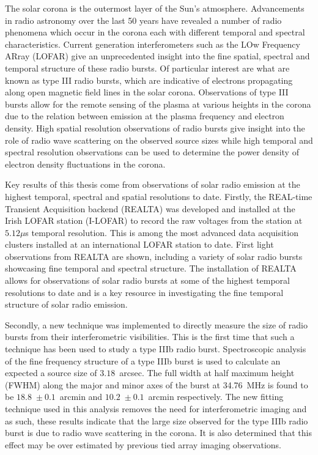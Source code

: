 \begin{abstracts} 
The solar corona is the outermost layer of the Sun's atmosphere. Advancements in radio astronomy over the last 50 years have revealed a number of radio phenomena which occur in the corona each with different temporal and spectral characteristics. Current generation interferometers such as the LOw Frequency ARray (LOFAR) give an unprecedented insight into the fine spatial, spectral and temporal structure of these radio bursts. Of particular interest are what are known as type III radio bursts, which are indicative of electrons propagating along open magnetic field lines in the solar corona. Observations of type III bursts allow for the remote sensing of the plasma at various heights in the corona due to the relation between emission at the plasma frequency and electron density. High spatial resolution observations of radio bursts give insight into the role of radio wave scattering on the observed source sizes while high temporal and spectral resolution observations can be used to determine the power density of electron density fluctuations in the corona.

Key results of this thesis come from observations of solar radio emission at the highest temporal, spectral and spatial resolutions to date. Firstly, the REAL-time Transient Acquisition backend (REALTA) was developed and installed at the Irish LOFAR station (I-LOFAR) to record the raw voltages from the station at $5.12 \mu$s temporal resolution. This is among the most advanced data acquisition clusters installed at an international LOFAR station to date. First light observations from REALTA are shown, including a variety of solar radio bursts showcasing fine temporal and spectral structure. The installation of REALTA allows for observations of solar radio bursts at some of the highest temporal resolutions to date and is a key resource in investigating the fine temporal structure of solar radio emission.

Secondly, a new technique was implemented to directly measure the size of radio bursts from their interferometric visibilities. This is the first time that such a technique has been used to study a type IIIb radio burst. Spectroscopic analysis of the fine frequency structure of a type IIIb burst is used to calculate an expected a source size of $3.18$~arcsec. The full width at half maximum height (FWHM) along the major and minor axes of the burst at 34.76~MHz is found to be $18.8$~$\pm~0.1$~arcmin and $10.2$~$\pm~0.1$~arcmin respectively.
 The new fitting technique used in this analysis removes the need for interferometric imaging and as such, these results indicate that the large size observed for the type IIIb radio burst is due to radio wave scattering in the corona. It is also determined that this effect may be over estimated by previous tied array imaging observations.%


\end{abstracts}
